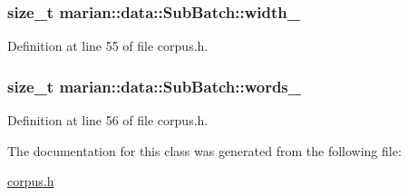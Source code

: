 \subsubsection[{\texorpdfstring{width\+\_\+}{width_}}]{\setlength{\rightskip}{0pt plus 5cm}size\+\_\+t marian\+::data\+::\+Sub\+Batch\+::width\+\_\+\hspace{0.3cm}{\ttfamily [private]}}\hypertarget{classmarian_1_1data_1_1SubBatch_a9def32712ced6b5851fdb45b711fb208}{}\label{classmarian_1_1data_1_1SubBatch_a9def32712ced6b5851fdb45b711fb208}


Definition at line 55 of file corpus.\+h.

\subsubsection[{\texorpdfstring{words\+\_\+}{words_}}]{\setlength{\rightskip}{0pt plus 5cm}size\+\_\+t marian\+::data\+::\+Sub\+Batch\+::words\+\_\+\hspace{0.3cm}{\ttfamily [private]}}\hypertarget{classmarian_1_1data_1_1SubBatch_a5c09bc4b07b770af975ea841f0bc98ee}{}\label{classmarian_1_1data_1_1SubBatch_a5c09bc4b07b770af975ea841f0bc98ee}


Definition at line 56 of file corpus.\+h.



The documentation for this class was generated from the following file\+:\begin{DoxyCompactItemize}
\item 
\hyperlink{corpus_8h}{corpus.\+h}\end{DoxyCompactItemize}
